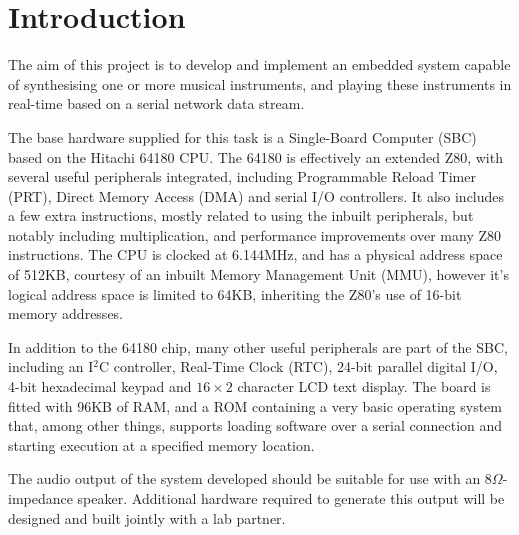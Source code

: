 \section{Introduction}

The aim of this project is to develop and implement an embedded system capable of synthesising one 
or more musical instruments, and playing these instruments in real-time based on a serial network 
data stream.

The base hardware supplied for this task is a Single-Board Computer (SBC) based on the Hitachi 64180 
CPU.  The 64180 is effectively an extended Z80, with several useful peripherals integrated, 
including Programmable Reload Timer (PRT), Direct Memory Access (DMA) and serial I/O controllers.  
It also includes a few extra instructions, mostly related to using the inbuilt peripherals, but 
notably including multiplication, and performance improvements over many Z80 instructions.  The CPU 
is clocked at 6.144MHz, and has a physical address space of 512KB, courtesy of an inbuilt Memory 
Management Unit (MMU), however it's logical address space is limited to 64KB, inheriting the Z80's 
use of 16-bit memory addresses.

In addition to the 64180 chip, many other useful peripherals are part of the SBC, including an 
I$^{2}$C controller, Real-Time Clock (RTC), 24-bit parallel digital I/O, 4-bit hexadecimal keypad 
and $16\times2$ character LCD text display.  The board is fitted with 96KB of RAM, and a ROM 
containing a very basic operating system that, among other things, supports loading software over a 
serial connection and starting execution at a specified memory location.

The audio output of the system developed should be suitable for use with an $8\Omega$-impedance 
speaker.  Additional hardware required to generate this output will be designed and built jointly 
with a lab partner.

